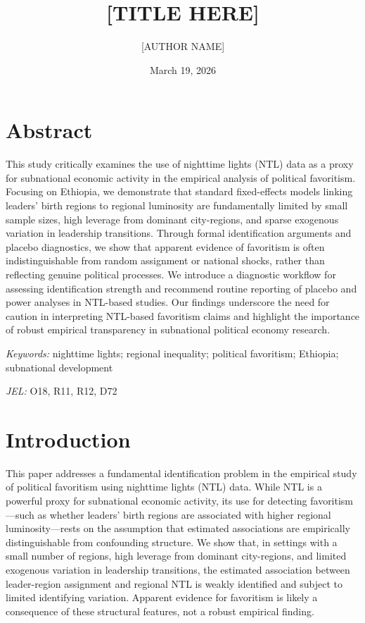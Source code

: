 \documentclass[12pt,a4paper]{article}
\title{[TITLE HERE]}
\author{[AUTHOR NAME]}
\date{March 19, 2026}
\begin{document}
	\maketitle
	


\section*{Abstract}
This study critically examines the use of nighttime lights (NTL) data as a proxy for subnational economic activity in the empirical analysis of political favoritism. Focusing on Ethiopia, we demonstrate that standard fixed-effects models linking leaders’ birth regions to regional luminosity are fundamentally limited by small sample sizes, high leverage from dominant city-regions, and sparse exogenous variation in leadership transitions. Through formal identification arguments and placebo diagnostics, we show that apparent evidence of favoritism is often indistinguishable from random assignment or national shocks, rather than reflecting genuine political processes. We introduce a diagnostic workflow for assessing identification strength and recommend routine reporting of placebo and power analyses in NTL-based studies. Our findings underscore the need for caution in interpreting NTL-based favoritism claims and highlight the importance of robust empirical transparency in subnational political economy research.


\noindent\textit{Keywords:} nighttime lights; regional inequality; political favoritism; Ethiopia; subnational development

\noindent\textit{JEL:} O18, R11, R12, D72

\section{Introduction}

This paper addresses a fundamental identification problem in the empirical study of political favoritism using nighttime lights (NTL) data. While NTL is a powerful proxy for subnational economic activity, its use for detecting favoritism—such as whether leaders’ birth regions are associated with higher regional luminosity—rests on the assumption that estimated associations are empirically distinguishable from confounding structure. We show that, in settings with a small number of regions, high leverage from dominant city-regions, and limited exogenous variation in leadership transitions, the estimated association between leader-region assignment and regional NTL is weakly identified and subject to limited identifying variation. Apparent evidence for favoritism is likely a consequence of these structural features, not a robust empirical finding.
\end{document}
